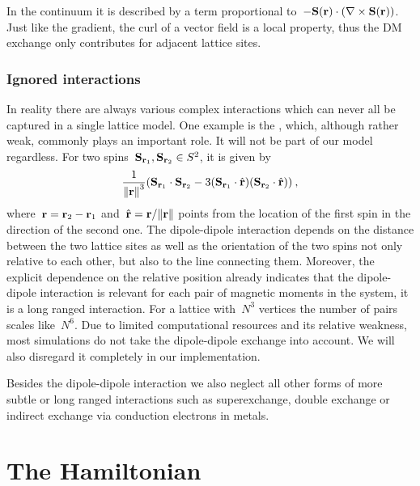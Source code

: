 In the continuum it is described by a term proportional to~$-\mathbf{S}(\mathbf{r}) \cdot
(\nabla \times \mathbf{S}(\mathbf{r}))$. Just like the gradient, the curl of a vector field is a
local property, thus the DM exchange only contributes for adjacent lattice
sites.

\subsubsection{Ignored interactions}

In reality there are always various complex interactions which can never all be
captured in a single lattice model. One example is the , which, although rather weak, commonly plays an important role. It
will not be part of our model regardless. For two spins~$\mathbf{S}_{\mathbf{r}_1}, \mathbf{S}_{\mathbf{r}_2}
\in S^2$, it is given by
%
\begin{equation}
  \frac{1}{\norm{\r}^{3}} (\S_{\r_1} \cdot \S_{\r_2} -
  3 (\S_{\r_1} \cdot \hat{\r}) (\S_{\r_2} \cdot \hat{\r}) )\:,
\end{equation}
%
where~$\mathbf{r} = \mathbf{r}_2 - \mathbf{r}_1$ and~$\hat{\r} = \r / \norm{\r}$ points from the
location of the first spin in the direction of the second one. The dipole-dipole
interaction depends on the distance between the two lattice sites as well as the
orientation of the two spins not only relative to each other, but also to the
line connecting them. Moreover, the explicit dependence on the relative position
already indicates that the dipole-dipole interaction is relevant for each pair
of magnetic moments in the system, it is a long ranged interaction. For a
lattice with~$N^3$ vertices the number of pairs scales like~$N^6$. Due to
limited computational resources and its relative weakness, most simulations do
not take the dipole-dipole exchange into account. We will also disregard it
completely in our implementation.

Besides the dipole-dipole interaction we also neglect all other forms of more
subtle or long ranged interactions such as superexchange, double exchange or
indirect exchange via conduction electrons in metals.
%
\section{The Hamiltonian}\label{sec:hamiltonian}
%


